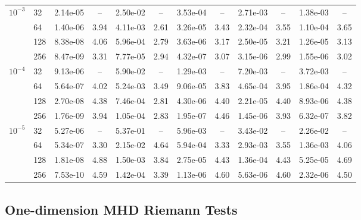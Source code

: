 \documentclass[a4paper,fleqn]{cas-sc}
\theoremstyle{remark}
\begin{document}
\begin{table}[pos=htbp]
\begin{tabular}{ll*{5}{rc}}
$10^{-3}$ & 32   & 2.14e-05 & --   & 2.50e-02 & --   & 3.53e-04 & --   & 2.71e-03 & --   & 1.38e-03 & --   \\
          & 64   & 1.40e-06 & 3.94 & 4.11e-03 & 2.61 & 3.26e-05 & 3.43 & 2.32e-04 & 3.55 & 1.10e-04 & 3.65 \\
          & 128  & 8.38e-08 & 4.06 & 5.96e-04 & 2.79 & 3.63e-06 & 3.17 & 2.50e-05 & 3.21 & 1.26e-05 & 3.13 \\
          & 256  & 8.47e-09 & 3.31 & 7.77e-05 & 2.94 & 4.32e-07 & 3.07 & 3.15e-06 & 2.99 & 1.55e-06 & 3.02 \\
$10^{-4}$ & 32   & 9.13e-06 & --   & 5.90e-02 & --   & 1.29e-03 & --   & 7.20e-03 & --   & 3.72e-03 & --   \\
          & 64   & 5.64e-07 & 4.02 & 5.24e-03 & 3.49 & 9.06e-05 & 3.83 & 4.65e-04 & 3.95 & 1.86e-04 & 4.32 \\
          & 128  & 2.70e-08 & 4.38 & 7.46e-04 & 2.81 & 4.30e-06 & 4.40 & 2.21e-05 & 4.40 & 8.93e-06 & 4.38 \\
          & 256  & 1.76e-09 & 3.94 & 1.05e-04 & 2.83 & 1.95e-07 & 4.46 & 1.45e-06 & 3.93 & 6.32e-07 & 3.82 \\
$10^{-5}$ & 32   & 5.27e-06 & --   & 5.37e-01 & --   & 5.96e-03 & --   & 3.43e-02 & --   & 2.26e-02 & --   \\
          & 64   & 5.34e-07 & 3.30 & 2.15e-02 & 4.64 & 5.94e-04 & 3.33 & 2.93e-03 & 3.55 & 1.36e-03 & 4.06 \\
          & 128  & 1.81e-08 & 4.88 & 1.50e-03 & 3.84 & 2.75e-05 & 4.43 & 1.36e-04 & 4.43 & 5.25e-05 & 4.69 \\
          & 256  & 7.53e-10 & 4.59 & 1.42e-04 & 3.39 & 1.13e-06 & 4.60 & 5.63e-06 & 4.60 & 2.32e-06 & 4.50 \\
\bottomrule
\end{tabular}
\end{table}

\subsection{One-dimension MHD Riemann Tests}
\label{sec:riemann1d}
\label{sec:MHD_1d}
\end{document}
